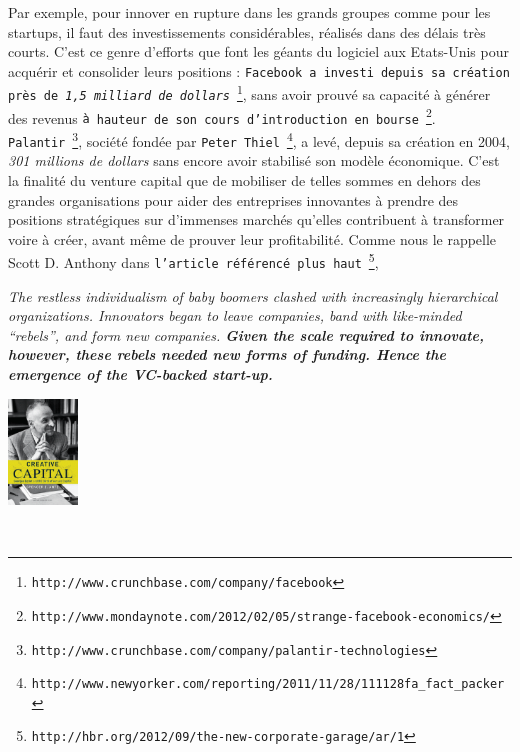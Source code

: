 \documentclass[11pt,twoside,a4paper]{article}
\begin{document}
Par exemple, pour innover en rupture dans les grands groupes comme pour les startups, il faut des investissements consid{\'e}rables, r{\'e}alis{\'e}s dans des d{\'e}lais tr{\`e}s courts. C'est ce genre d'efforts que font les g{\'e}ants du logiciel aux Etats-Unis pour acqu{\'e}rir et consolider leurs positions : \texttt{Facebook a investi depuis sa cr{\'e}ation pr{\`e}s de \emph{1,5 milliard de dollars}}~\footnote{\texttt{http://www.crunchbase.com/company/facebook}}, sans avoir prouv{\'e} sa capacit{\'e} {\`a} g{\'e}n{\'e}rer des revenus \texttt{{\`a} hauteur de son cours d'introduction en bourse}~\footnote{\texttt{http://www.mondaynote.com/2012/02/05/strange-facebook-economics/}}. \texttt{Palantir}~\footnote{\texttt{http://www.crunchbase.com/company/palantir-technologies}}, soci{\'e}t{\'e} fond{\'e}e par \texttt{Peter Thiel}~\footnote{\texttt{http://www.newyorker.com/reporting/2011/11/28/111128fa\_fact\_packer}}, a lev{\'e}, depuis sa cr{\'e}ation en 2004, \emph{301 millions de dollars} sans encore avoir stabilis{\'e} son mod{\`e}le {\'e}conomique. C'est la finalit{\'e} du venture capital que de mobiliser de telles sommes en dehors des grandes organisations pour aider des entreprises innovantes {\`a} prendre des positions strat{\'e}giques sur d'immenses march{\'e}s qu'elles contribuent {\`a} transformer voire {\`a} cr{\'e}er, avant m{\^e}me de prouver leur profitabilit{\'e}. Comme nous le rappelle Scott D. Anthony dans \texttt{l'article r{\'e}f{\'e}renc{\'e} plus haut}~\footnote{\texttt{http://hbr.org/2012/09/the-new-corporate-garage/ar/1}}, ~\\

\begin{minipage}[h]{14.00cm}
    \emph{The restless individualism of baby boomers clashed with increasingly hierarchical organizations. Innovators began to leave companies, band with like-minded ``rebels'', and form new companies. \textbf{Given the scale required to innovate, however, these rebels needed new forms of funding. Hence the emergence of the VC-backed start-up. } }
\end{minipage} \hfill \begin{minipage}[h]{2cm}
	\includegraphics[width=1.85cm]{img/creative-capital-cr-197x300.png}
\end{minipage} ~\\
\end{document}
